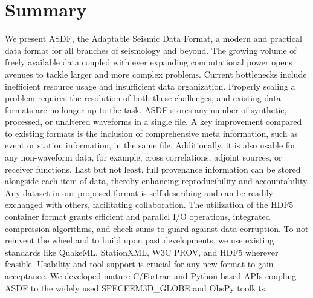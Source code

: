 \section*{Summary}

We present ASDF, the Adaptable Seismic Data Format, a modern and practical data
format for all branches of seismology and beyond.
The growing volume of freely available data coupled with ever expanding
computational power opens avenues to tackle larger and more complex problems.
Current bottlenecks include inefficient resource usage and insufficient data
organization. Properly scaling a problem requires the resolution of both these
challenges, and existing data formats are no longer up to the task.
ASDF stores any number of synthetic, processed, or unaltered waveforms in a
single file. A key improvement compared to existing formats is the inclusion of
comprehensive meta information, such as event or station information, in the
same file.  Additionally, it is also usable for any non-waveform data, for
example, cross correlations, adjoint sources, or receiver functions. Last but
not least, full provenance information can be stored alongside each item of
data, thereby enhancing reproducibility and accountability. Any dataset in our
proposed format is self-describing and can be readily exchanged with others,
facilitating collaboration.
The utilization of the HDF5 container format grants efficient and parallel
I/O operations, integrated compression algorithms, and check sums to guard
against data corruption. To not reinvent the wheel and to build upon past
developments, we use existing standards like QuakeML, StationXML, W3C PROV, and
HDF5 wherever feasible.
Usability and tool support is crucial for any new format to gain acceptance. We
developed mature C/Fortran and Python based APIs coupling ASDF to the widely
used SPECFEM3D\_GLOBE and ObsPy toolkits.
